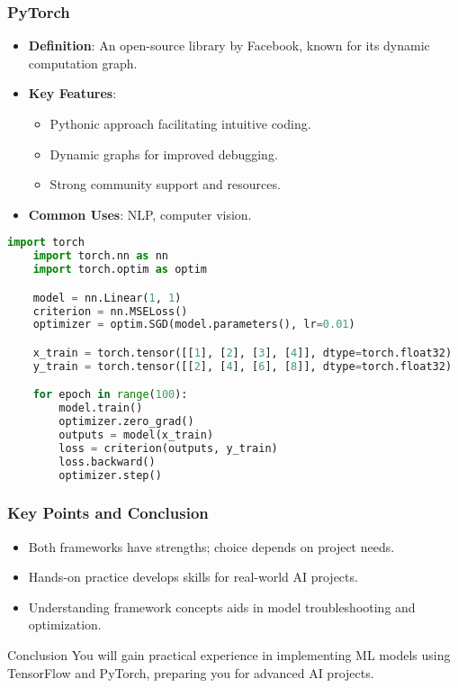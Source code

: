 \documentclass{beamer}
\begin{document}
\begin{frame}[fragile]
    \frametitle{PyTorch}
    \begin{itemize}
        \item \textbf{Definition}: An open-source library by Facebook, known for its dynamic computation graph.
        \item \textbf{Key Features}:
        \begin{itemize}
            \item Pythonic approach facilitating intuitive coding.
            \item Dynamic graphs for improved debugging.
            \item Strong community support and resources.
        \end{itemize}
        \item \textbf{Common Uses}: NLP, computer vision.
    \end{itemize}
    
    \begin{lstlisting}[language=Python, caption=Example Code Snippet]
    import torch
    import torch.nn as nn
    import torch.optim as optim

    model = nn.Linear(1, 1)
    criterion = nn.MSELoss()
    optimizer = optim.SGD(model.parameters(), lr=0.01)

    x_train = torch.tensor([[1], [2], [3], [4]], dtype=torch.float32)
    y_train = torch.tensor([[2], [4], [6], [8]], dtype=torch.float32)

    for epoch in range(100):
        model.train()
        optimizer.zero_grad()
        outputs = model(x_train)
        loss = criterion(outputs, y_train)
        loss.backward()
        optimizer.step()
    \end{lstlisting}
\end{frame}

\begin{frame}[fragile]
    \frametitle{Key Points and Conclusion}
    \begin{itemize}
        \item Both frameworks have strengths; choice depends on project needs.
        \item Hands-on practice develops skills for real-world AI projects.
        \item Understanding framework concepts aids in model troubleshooting and optimization.
    \end{itemize}
    \begin{block}{Conclusion}
        You will gain practical experience in implementing ML models using TensorFlow and PyTorch, preparing you for advanced AI projects.
    \end{block}
\end{frame}
\end{document}
